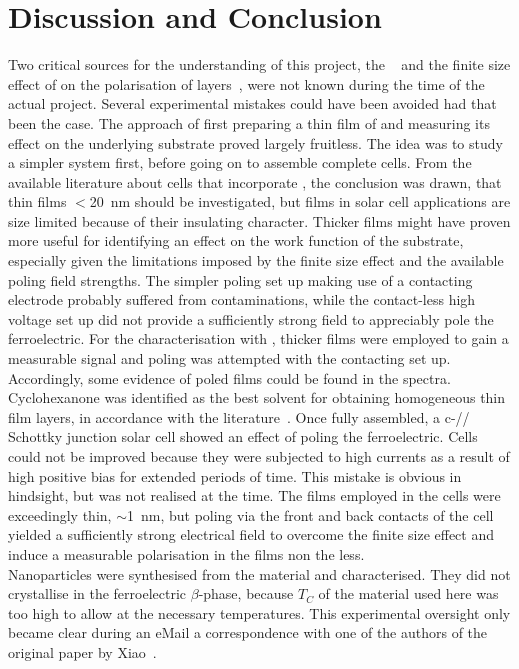 \newpage
\section{Discussion and Conclusion}
Two critical sources for the understanding of this project, the ~\cite{encyclopedia} and the finite size effect of on the polarisation of \pvdf{} layers~\cite{ducharme_finitesize}, were not known during the time of the actual project. Several experimental mistakes could have been avoided had that been the case. The approach of first preparing a thin film of \pvdf{} and measuring its effect on the underlying substrate proved largely fruitless. The idea was to study a simpler system first, before going on to assemble complete cells. From the available literature about cells that incorporate \pvdf{}, the conclusion was drawn, that thin films $<$\SI{20}{\nano\metre} should be investigated, but \pvdf{} films in solar cell applications are size limited because of their insulating character. Thicker films might have proven more useful for identifying an effect on the work function of the substrate, especially given the limitations imposed by the finite size effect and the available poling field strengths. The simpler poling set up making use of a contacting electrode probably suffered from contaminations, while the contact-less high voltage set up did not provide a sufficiently strong field to appreciably pole the ferroelectric. For the characterisation with \ftir{}, thicker films were employed to gain a measurable signal and poling was attempted with the contacting set up. Accordingly, some evidence of poled \pvdf{} films could be found in the \ftir{} spectra. Cyclohexanone was identified as the best solvent for obtaining homogeneous \pvdf{} thin film layers, in accordance with the literature~\cite{naber_cyclo}. Once fully assembled, a c-\sih{}/\pvdf{}/\pdot{} Schottky junction solar cell showed an effect of poling the ferroelectric. Cells could not be improved because they were subjected to high currents as a result of high positive bias for extended periods of time. This mistake is obvious in hindsight, but was not realised at the time. The \pvdf{} films employed in the cells were exceedingly thin, $\sim$\SI{1}{\nano\metre}, but poling via the front and back contacts of the cell yielded a sufficiently strong electrical field to overcome the finite size effect and induce a measurable polarisation in the films non the less.\\
Nanoparticles were synthesised from the material and characterised. They did not crystallise in the ferroelectric $\beta$-phase, because $T_C$ of the material used here was too high to allow  at the necessary temperatures. This experimental oversight only became clear during an eMail a correspondence with one of the authors of the original paper by Xiao~\etal{}.\\
